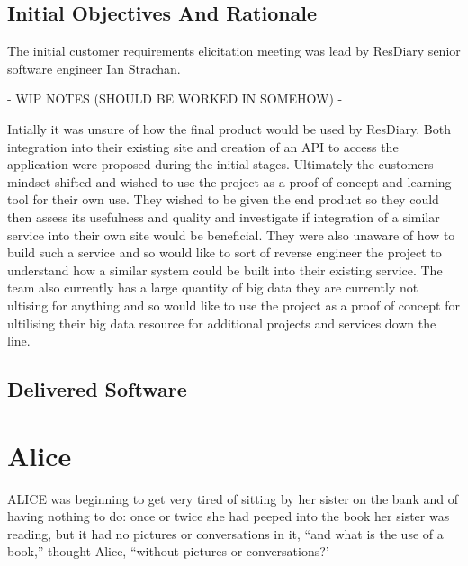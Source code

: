 \documentclass{l3proj}
\begin{document}
\subsection{Initial Objectives And Rationale}
\label{initobjectives}

The initial customer requirements elicitation meeting was lead by ResDiary senior software engineer Ian Strachan. 

- WIP NOTES (SHOULD BE WORKED IN SOMEHOW) -

Intially it was unsure of how the final product would be used by ResDiary. Both integration into their existing site and creation of an API to access the application were proposed during the initial stages. 
Ultimately the customers mindset shifted and wished to use the project as a proof of concept and learning tool for their own use.
They wished to be given the end product so they could then assess its usefulness and quality and investigate if integration of a similar service into their own site would be beneficial.
They were also unaware of how to build such a service and so would like to sort of reverse engineer the project to understand how a similar system could be built into their existing service.
The team also currently has a large quantity of big data they are currently not ultising for anything and so would like to use the project as a proof of concept for ultilising their big data resource for additional projects and services down the line.

\subsection{Delivered Software}
\label{finsoftware}

\newpage

\section{Alice}
\label{sec:alice}

ALICE \cite{alice} was beginning to get very tired of sitting by her sister
on the bank and of having nothing to do: once or twice she had peeped into
the book her sister was reading, but it had no pictures or conversations in
it, ``and what is the use of a book,'' thought Alice, ``without pictures or
conversations?'
\end{document}
